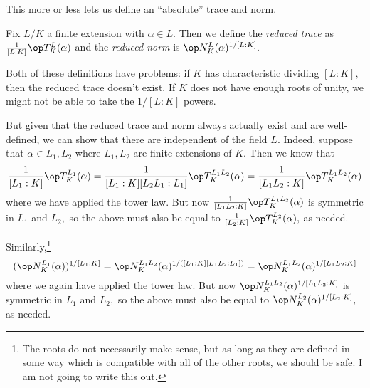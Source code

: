 \documentclass[../notes.tex]{subfiles}
\begin{document}
This more or less lets us define an ``absolute'' trace and norm.
\begin{definition}
	Fix $L/K$ a finite extension with $\alpha\in L.$ Then we define the \textit{reduced trace} as $\frac1{[L:K]}\op T^L_K(\alpha)$ and the \textit{reduced norm} is $\op N^L_K(\alpha)^{1/[L:K]}.$
\end{definition}
Both of these definitions have problems: if $K$ has characteristic dividing $[L:K],$ then the reduced trace doesn't exist. If $K$ does not have enough roots of unity, we might not be able to take the $1/[L:K]$ powers.

But given that the reduced trace and norm always actually exist and are well-defined, we can show that there are independent of the field $L.$ Indeed, suppose that $\alpha\in L_1,L_2$ where $L_1,L_2$ are finite extensions of $K.$ Then we know that
\[\frac1{[L_1:K]}\op T^{L_1}_K(\alpha)=\frac1{[L_1:K][L_2L_1:L_1]}\op T^{L_1L_2}_K(\alpha)=\frac1{[L_1L_2:K]}\op T^{L_1L_2}_K(\alpha)\]
where we have applied the tower law. But now $\frac1{[L_1L_2:K]}\op T^{L_1L_2}_K(\alpha)$ is symmetric in $L_1$ and $L_2,$ so the above must also be equal to $\frac1{[L_2:K]}\op T^{L_2}_K(\alpha),$ as needed.

Similarly,\footnote{The roots do not necessarily make sense, but as long as they are defined in some way which is compatible with all of the other roots, we should be safe. I am not going to write this out.}
\[(\op N^{L_1}_K(\alpha))^{1/[L_1:K]}=\op N^{L_1L_2}_K(\alpha)^{1/([L_1:K][L_1L_2:L_1])}=\op N^{L_1L_2}_K(\alpha)^{1/[L_1L_2:K]}\]
where we again have applied the tower law. But now $\op N^{L_1L_2}_K(\alpha)^{1/[L_1L_2:K]}$ is symmetric in $L_1$ and $L_2,$ so the above must also be equal to $\op N^{L_2}_K(\alpha)^{1/[L_2:K]},$ as needed.
\end{document}
